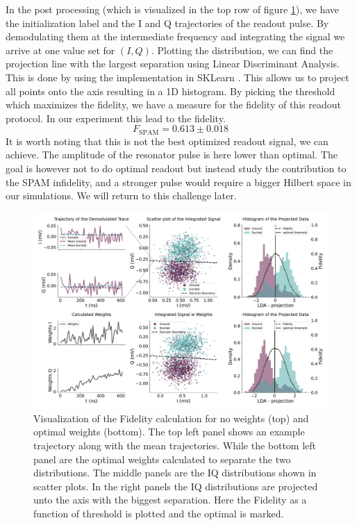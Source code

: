 In the post processing (which is visualized in the top row of figure \ref{fig:readout_process}), we have the initialization label and the I and Q trajectories of the readout pulse. By demodulating them at the intermediate frequency and integrating the signal we arrive at one value set for $(I, Q)$. Plotting the distribution, we can find the projection line with the largest separation using Linear Discriminant Analysis. This is done by using the implementation in SKLearn \cite{pedregosa_scikit-learn_nodate}. This allows us to project all points onto the axis resulting in a 1D histogram. By picking the threshold which maximizes the fidelity, we have a measure for the fidelity of this readout protocol. In our experiment this lead to the fidelity.
\begin{equation}
    F_{\text{SPAM}} = 0.613\pm 0.018
\end{equation}
It is worth noting that this is not the best optimized readout signal, we can achieve. The amplitude of the resonator pulse is here lower than optimal. The goal is however not to do optimal readout but instead study the contribution to the SPAM infidelity, and a stronger pulse would require a bigger Hilbert space in our simulations. We will return to this challenge later.
\begin{figure}[t]
    \centering
    \includegraphics{Readout/Figs/Introduction.pdf}
    \caption{Visualization of the Fidelity calculation for no weights (top) and optimal weights (bottom). The top left panel shows an example trajectory along with the mean trajectories. While the bottom left panel are the optimal weights calculated to separate the two distributions. The middle panels are the IQ distributions shown in scatter plots. In the right panels the IQ distributions are projected unto the axis with the biggest separation. Here the Fidelity as a function of threshold is plotted and the optimal is marked.}
    \label{fig:readout_process}
\end{figure}



